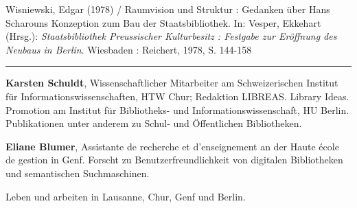\documentclass[a4paper,
fontsize=11pt,
oneside,
numbers=noperiodatend,
parskip=half-,
bibliography=totoc,
final
]{scrartcl}
\begin{document}
Wisniewski, Edgar (1978) / Raumvision und Struktur : Gedanken über Hans
Scharouns Konzeption zum Bau der Staatsbibliothek. In: Vesper, Ekkehart
(Hrsg.): \emph{Staatsbibliothek Preussischer Kulturbesitz : Festgabe zur
Eröffnung des Neubaus in Berlin}. Wiesbaden : Reichert, 1978, S. 144-158

\newpage

\begin{center}\rule{3in}{0.4pt}\end{center}

\textbf{Karsten Schuldt}, Wissenschaftlicher Mitarbeiter am
Schweizerischen Institut für Informations\-wissen\-schaften, HTW Chur;
Redaktion LIBREAS. Library Ideas. Promotion am Institut für Bib\-liotheks-
und Informationswissenschaft, HU Berlin. Publikationen unter anderem zu
Schul- und Öffentlichen Bibliotheken.

\textbf{Eliane Blumer}, Assistante de recherche et d'enseignement an der
Haute école de gestion in Genf. Forscht zu Benutzerfreundlichkeit von
digitalen Bibliotheken und semantischen Suchmaschinen.

Leben und arbeiten in Lausanne, Chur, Genf und Berlin.
\end{document}
